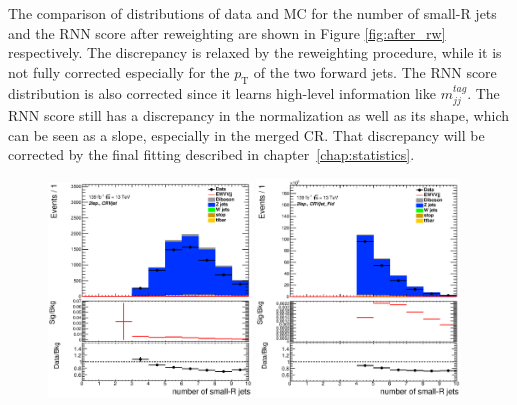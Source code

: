 The comparison of distributions of data and MC for the number of small-R jets and 
the RNN score after reweighting are shown in Figure \ref{fig:after_rw}
respectively. The discrepancy is relaxed by the reweighting procedure, while it is not fully corrected especially for the $p_\mathrm{T}$ of the two forward jets.
The RNN score distribution is also corrected since it learns high-level information like $m^{tag}_{jj}$.
The RNN score still has a discrepancy in the normalization as well as its shape, which can be seen as a slope, especially in the merged CR.
That discrepancy will be corrected by the final fitting described in chapter~\ref{chap:statistics}.
\begin{figure}[ht]
    \centering
    \includegraphics[width=0.48\textwidth]{figures/2lep/reweighting/after_reweighting/C_0ptag1pfat0pjet_0ptv_CRVjet_NJets_Lin.eps}
    \includegraphics[width=0.48\textwidth]{figures/2lep/reweighting/after_reweighting/C_0ptag2pjet_0ptv_CRVjet_Fid_NJets_Lin.eps}

\end{figure}
